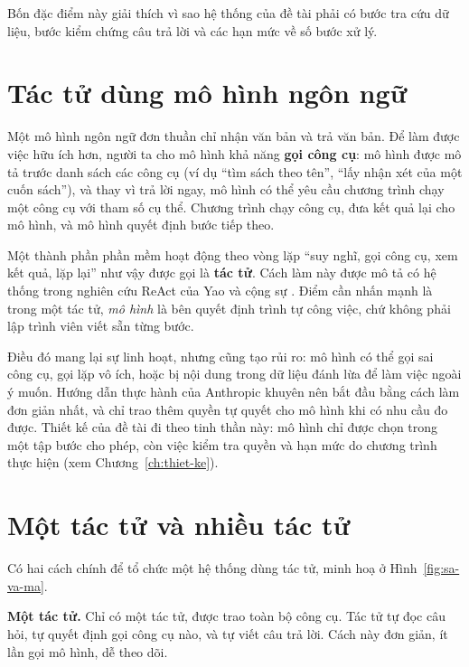 Bốn đặc điểm này giải thích vì sao hệ thống của đề tài phải có bước tra cứu dữ liệu, bước kiểm chứng câu trả lời và các hạn mức về số bước xử lý.

\section{Tác tử dùng mô hình ngôn ngữ}

Một mô hình ngôn ngữ đơn thuần chỉ nhận văn bản và trả văn bản. Để làm được việc hữu ích hơn, người ta cho mô hình khả năng \textbf{gọi công cụ}: mô hình được mô tả trước danh sách các công cụ (ví dụ ``tìm sách theo tên'', ``lấy nhận xét của một cuốn sách''), và thay vì trả lời ngay, mô hình có thể yêu cầu chương trình chạy một công cụ với tham số cụ thể. Chương trình chạy công cụ, đưa kết quả lại cho mô hình, và mô hình quyết định bước tiếp theo.

Một thành phần phần mềm hoạt động theo vòng lặp ``suy nghĩ, gọi công cụ, xem kết quả, lặp lại'' như vậy được gọi là \textbf{tác tử}. Cách làm này được mô tả có hệ thống trong nghiên cứu ReAct của Yao và cộng sự . Điểm cần nhấn mạnh là trong một tác tử, \emph{mô hình} là bên quyết định trình tự công việc, chứ không phải lập trình viên viết sẵn từng bước.

Điều đó mang lại sự linh hoạt, nhưng cũng tạo rủi ro: mô hình có thể gọi sai công cụ, gọi lặp vô ích, hoặc bị nội dung trong dữ liệu đánh lừa để làm việc ngoài ý muốn. Hướng dẫn thực hành của Anthropic  khuyên nên bắt đầu bằng cách làm đơn giản nhất, và chỉ trao thêm quyền tự quyết cho mô hình khi có nhu cầu đo được. Thiết kế của đề tài đi theo tinh thần này: mô hình chỉ được chọn trong một tập bước cho phép, còn việc kiểm tra quyền và hạn mức do chương trình thực hiện (xem Chương~\ref{ch:thiet-ke}).

\section{Một tác tử và nhiều tác tử}

Có hai cách chính để tổ chức một hệ thống dùng tác tử, minh hoạ ở Hình~\ref{fig:sa-va-ma}.


\textbf{Một tác tử.} Chỉ có một tác tử, được trao toàn bộ công cụ. Tác tử tự đọc câu hỏi, tự quyết định gọi công cụ nào, và tự viết câu trả lời. Cách này đơn giản, ít lần gọi mô hình, dễ theo dõi.

